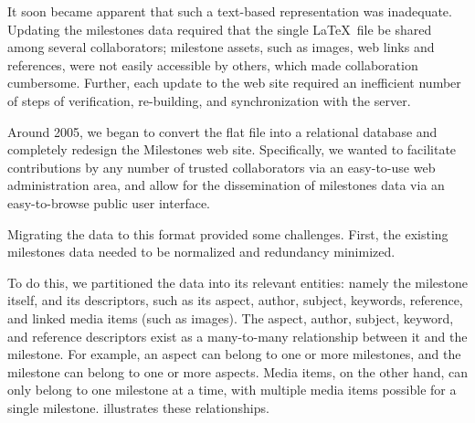 It soon became apparent that such a text-based representation was inadequate. Updating the milestones data required that the single \LaTeX\ file be shared among several collaborators; milestone assets, such as images, web links and references, were not easily accessible by others, which made collaboration cumbersome. Further, each update to the web site required an inefficient number of steps of verification, re-building, and synchronization with the server.

Around 2005, we began to convert the flat file into a relational database and completely redesign the Milestones web site. Specifically, we wanted to facilitate contributions by any number of trusted collaborators via an easy-to-use web administration area, and allow for the dissemination of milestones data via an easy-to-browse public user interface.

Migrating the data to this format provided some challenges. First, the existing milestones data needed to be normalized and redundancy minimized. 

To do this, we partitioned the data into its relevant entities: namely the milestone itself, and its descriptors, such as its aspect, author, subject, keywords, reference, and linked media items (such as images). The aspect, author, subject, keyword, and reference descriptors exist as a many-to-many relationship between it and the milestone. For example, an aspect can belong to one or more milestones, and the milestone can belong to one or more aspects. Media items, on the other hand, can only belong to one milestone at a time, with multiple media items possible for a single milestone.  illustrates these relationships.

